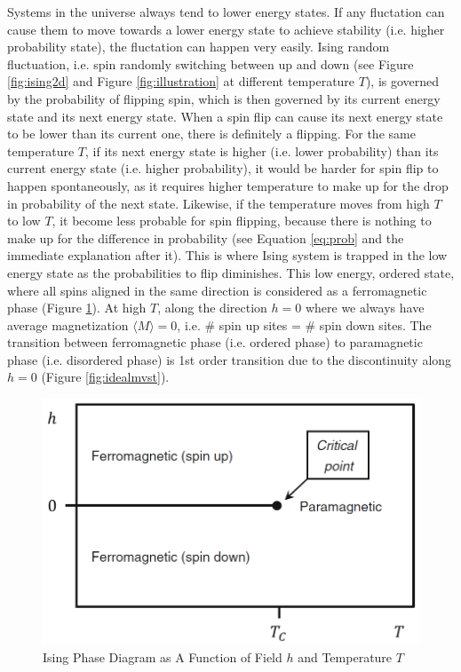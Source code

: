 \documentclass[a4paper]{article}
\numberwithin{equation}{section}
\begin{document}
Systems in the universe always tend to lower energy states. If any fluctation can cause them to move towards a lower energy state to achieve stability (i.e. higher probability state), the fluctation can happen very easily. Ising random fluctuation, i.e. spin randomly switching between up and down (see Figure \ref{fig:ising2d} and Figure \ref{fig:illustration} at different temperature $T$), is governed by the probability of flipping spin, which is then governed by its current energy state and its next energy state. When a spin flip can cause its next energy state to be lower than its current one, there is definitely a flipping. For the same temperature $T$, if its next energy state is higher (i.e. lower probability) than its current energy state (i.e. higher probability), it would be harder for spin flip to happen spontaneously, as it requires higher temperature to make up for the drop in probability of the next state. Likewise, if the temperature moves from high $T$ to low $T$, it become less probable for spin flipping, because there is nothing to make up for the difference in probability (see Equation \ref{eq:prob} and the immediate explanation after it). This is where Ising system is trapped in the low energy state as the probabilities to flip diminishes. This low energy, ordered state, where all spins aligned in the same direction is considered as a ferromagnetic phase (Figure \ref{fig:phase}). At high $T$, along the direction $h=0$ where we always have average magnetization $\langle M \rangle=0$, i.e. \# spin up sites = \# spin down sites. The transition between ferromagnetic phase (i.e. ordered phase) to paramagnetic phase (i.e. disordered phase) is 1st order transition due to the discontinuity along $h=0$ (Figure \ref{fig:idealmvst}).
\begin{figure}
	\centering
	\includegraphics[scale=0.35]{idealphase.png}
	\caption{Ising Phase Diagram as A Function of Field $h$ and Temperature $T$ \cite{softmatter}}
	\label{fig:phase}
\end{figure}
\end{document}
